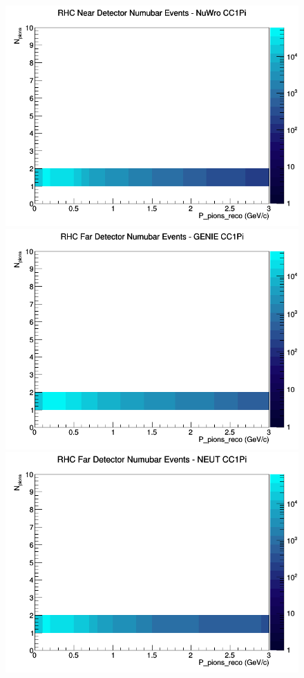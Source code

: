 \documentclass[12pt]{article}
\begin{document}
\begin{figure}[h]
\includegraphics[width=\linewidth]{eff_N_P/GAr/pions/CC1Pi_RHC_ND_numubar_N_P_NuWro.png}
\endminipage
\newline
{}
\includegraphics[width=\linewidth]{eff_N_P/GAr/pions/CC1Pi_RHC_FD_numubar_N_P_GENIE.png}
\endminipage
{}
\includegraphics[width=\linewidth]{eff_N_P/GAr/pions/CC1Pi_RHC_FD_numubar_N_P_NEUT.png}

\end{figure}
\end{document}
